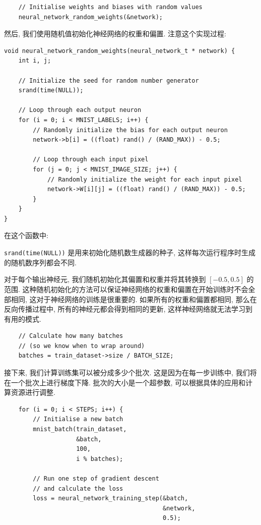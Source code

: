 \documentclass{ctexart}
\begin{document}
\begin{verbatim}  
    // Initialise weights and biases with random values  
    neural_network_random_weights(&network);  
\end{verbatim}

然后, 我们使用随机值初始化神经网络的权重和偏置. 注意这个实现过程:

\begin{verbatim}
void neural_network_random_weights(neural_network_t * network) {  
    int i, j;  
  
    // Initialize the seed for random number generator  
    srand(time(NULL));  
  
    // Loop through each output neuron  
    for (i = 0; i < MNIST_LABELS; i++) {  
        // Randomly initialize the bias for each output neuron  
        network->b[i] = ((float) rand() / (RAND_MAX)) - 0.5;  
  
        // Loop through each input pixel  
        for (j = 0; j < MNIST_IMAGE_SIZE; j++) {  
            // Randomly initialize the weight for each input pixel  
            network->W[i][j] = ((float) rand() / (RAND_MAX)) - 0.5;  
        }  
    }  
}  
\end{verbatim}

在这个函数中:

\verb|srand(time(NULL))| 是用来初始化随机数生成器的种子, 这样每次运行程序时生成的随机数序列都会不同.

对于每个输出神经元, 我们随机初始化其偏置和权重并将其转换到 $[-0.5, 0.5]$ 的范围. 
这种随机初始化的方法可以保证神经网络的权重和偏置在开始训练时不会全部相同, 这对于神经网络的训练是很重要的. 
如果所有的权重和偏置都相同, 那么在反向传播过程中, 所有的神经元都会得到相同的更新, 这样神经网络就无法学习到有用的模式.

\begin{verbatim}  
    // Calculate how many batches 
    // (so we know when to wrap around)  
    batches = train_dataset->size / BATCH_SIZE;  
\end{verbatim}

接下来, 我们计算训练集可以被分成多少个批次. 这是因为在每一步训练中, 我们将在一个批次上进行梯度下降.
批次的大小是一个超参数, 可以根据具体的应用和计算资源进行调整.

\begin{verbatim}  
    for (i = 0; i < STEPS; i++) {  
        // Initialise a new batch  
        mnist_batch(train_dataset, 
                    &batch, 
                    100, 
                    i % batches);  
  
        // Run one step of gradient descent 
        // and calculate the loss  
        loss = neural_network_training_step(&batch, 
                                            &network, 
                                            0.5);  
\end{verbatim}
\end{document}

